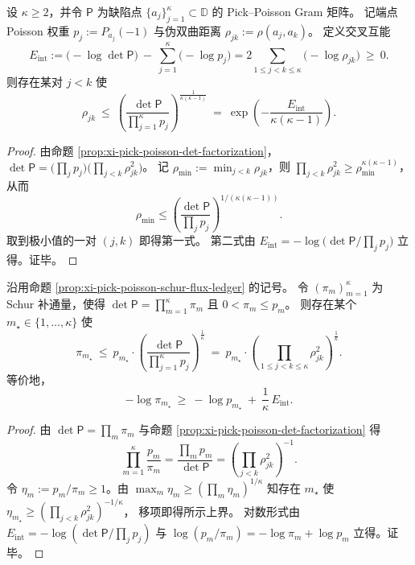 \begin{corollary}\label{cor:xi-pick-poisson-near-collision-certificate}
设 \(\kappa\ge 2\)，并令 \(\mathsf P\) 为缺陷点 \(\{a_j\}_{j=1}^{\kappa}\subset\mathbb{D}\) 的 Pick--Poisson Gram 矩阵。
记端点 Poisson 权重 \(p_j:=P_{a_j}(-1)\) 与伪双曲距离 \(\rho_{jk}:=\rho(a_j,a_k)\)。
定义交叉互能
\[
E_{\mathrm{int}}
:=\bigl(-\log\det\mathsf P\bigr)\ -\ \sum_{j=1}^{\kappa}\bigl(-\log p_j\bigr)
=2\sum_{1\le j<k\le\kappa}\bigl(-\log\rho_{jk}\bigr)\ \ge\ 0.
\]
则存在某对 \(j<k\) 使
\[
\rho_{jk}\ \le\
\left(\frac{\det\mathsf P}{\prod_{j=1}^{\kappa}p_j}\right)^{\!\frac1{\kappa(\kappa-1)}}
\ =\
\exp\!\left(-\frac{E_{\mathrm{int}}}{\kappa(\kappa-1)}\right).
\]
\end{corollary}
\begin{proof}
由命题 \ref{prop:xi-pick-poisson-det-factorization}，
\(
\det\mathsf P=\bigl(\prod_j p_j\bigr)\bigl(\prod_{j<k}\rho_{jk}^2\bigr)
\)。
记 \(\rho_{\min}:=\min_{j<k}\rho_{jk}\)，则 \(\prod_{j<k}\rho_{jk}^2\ge \rho_{\min}^{\kappa(\kappa-1)}\)，从而
\[
\rho_{\min}\le \left(\frac{\det\mathsf P}{\prod_j p_j}\right)^{1/(\kappa(\kappa-1))}.
\]
取到极小值的一对 \((j,k)\) 即得第一式。
第二式由 \(E_{\mathrm{int}}=-\log\!\bigl(\det\mathsf P/\prod_j p_j\bigr)\) 立得。证毕。
\end{proof}

\begin{corollary}\label{cor:xi-pick-poisson-schur-one-step-collapse}
沿用命题 \ref{prop:xi-pick-poisson-schur-flux-ledger} 的记号。
令 \((\pi_m)_{m=1}^{\kappa}\) 为 Schur 补通量，使得 \(\det\mathsf P=\prod_{m=1}^{\kappa}\pi_m\) 且 \(0<\pi_m\le p_m\)。
则存在某个 \(m_\star\in\{1,\dots,\kappa\}\) 使
\[
\pi_{m_\star}\ \le\ p_{m_\star}\cdot
\left(\frac{\det\mathsf P}{\prod_{j=1}^{\kappa}p_j}\right)^{\!\frac1\kappa}
\ =\
p_{m_\star}\cdot\left(\prod_{1\le j<k\le\kappa}\rho_{jk}^2\right)^{\!\frac1\kappa}.
\]
等价地，
\[
-\log\pi_{m_\star}\ \ge\ -\log p_{m_\star}\ +\ \frac1\kappa\,E_{\mathrm{int}}.
\]
\end{corollary}
\begin{proof}
由 \(\det\mathsf P=\prod_m \pi_m\) 与命题 \ref{prop:xi-pick-poisson-det-factorization} 得
\[
\prod_{m=1}^{\kappa}\frac{p_m}{\pi_m}
=\frac{\prod_m p_m}{\det\mathsf P}
=\left(\prod_{j<k}\rho_{jk}^2\right)^{-1}.
\]
令 \(\eta_m:=p_m/\pi_m\ge 1\)。由 \(\max_m\eta_m\ge (\prod_m\eta_m)^{1/\kappa}\) 知存在 \(m_\star\) 使
\(
\eta_{m_\star}\ge \left(\prod_{j<k}\rho_{jk}^2\right)^{-1/\kappa}
\)，
移项即得所示上界。
对数形式由 \(E_{\mathrm{int}}=-\log(\det\mathsf P/\prod_j p_j)\) 与 \(\log(p_m/\pi_m)=-\log\pi_m+\log p_m\) 立得。证毕。
\end{proof}

